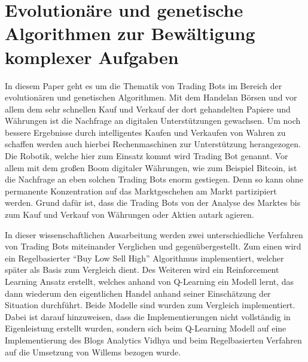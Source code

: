 \chapter{Evolutionäre und genetische Algorithmen zur Bewältigung komplexer Aufgaben}

In diesem Paper geht es um die Thematik von Trading Bots im Bereich der evolutionären und genetischen Algorithmen. 
Mit dem Handelan Börsen und vor allem dem sehr schnellen Kauf und Verkauf der dort gehandelten Papiere und Währungen ist die Nachfrage an digitalen Unterstützungen gewachsen. \cite{admirals_2018} Um noch bessere Ergebnisse durch intelligentes Kaufen und Verkaufen von Wahren zu schaffen werden auch hierbei Rechenmaschinen zur Unterstützung herangezogen. Die Robotik, welche hier zum Einsatz kommt wird Trading Bot genannt. \cite{scheuschner_2021} Vor allem mit dem großen Boom digitaler Währungen, wie zum Beispiel Bitcoin, ist die Nachfrage an eben solchen Trading Bots enorm gestiegen. \cite{scheuschner_2021} Denn so kann ohne permanente Konzentration auf das Marktgeschehen am Markt partizipiert werden. Grund dafür ist, dass die Trading Bots von der Analyse des Marktes bis zum Kauf und Verkauf von Währungen oder Aktien autark agieren.

In dieser wissenschaftlichen Ausarbeitung werden zwei unterschiedliche Verfahren von Trading Bots miteinander Verglichen und gegenübergestellt. Zum einen wird ein Regelbasierter \enquote{Buy Low Sell High} Algorithmus implementiert, welcher später als Basis zum Vergleich dient. Des Weiteren wird ein Reinforcement Learning Ansatz erstellt, welches anhand von Q-Learning ein Modell lernt, das dann wiederum den eigentlichen Handel anhand seiner Einschätzung der Situation durchführt. Beide Modelle sind wurden zum Vergleich implementiert. Dabei ist darauf hinzuweisen, dass die Implementierungen nicht vollständig in Eigenleistung erstellt wurden, sondern sich beim Q-Learning Modell auf eine Implementierung des Blogs Analytics Vidhya \cite{analyticsvidhya_2021} und beim Regelbasierten Verfahren auf die Umsetzung von Willems \cite{willems_2019} bezogen wurde.

